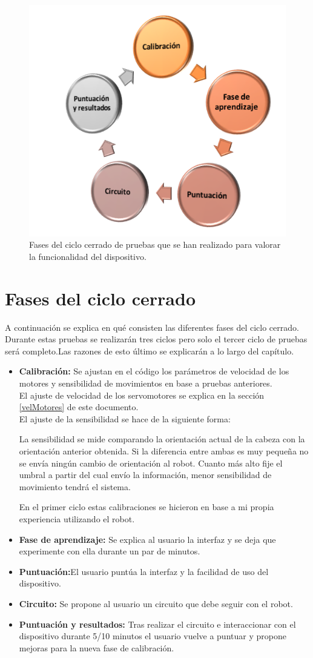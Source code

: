 \documentclass[twoside, 11pt]{epstfg}
\begin{document}
\begin{figure}[h!]
	\centerline{
		\mbox{\includegraphics[width=.60\textwidth]{images/CicloPruebas.png}}
	}
	\caption{Fases del ciclo cerrado de pruebas que se han realizado para valorar la funcionalidad del dispositivo.}
	\label{ciclo}
\end{figure}

\section{Fases del ciclo cerrado}
A continuación se explica en qué consisten las diferentes fases del ciclo cerrado. Durante estas pruebas se realizarán tres ciclos pero solo el tercer ciclo de pruebas será completo.Las razones de esto último se explicarán a lo largo del capítulo.

\begin{itemize}
	\item \textbf{Calibración:} Se ajustan en el código los parámetros de velocidad de los motores y sensibilidad de movimientos en base a pruebas anteriores.\\ El ajuste de velocidad de los servomotores se explica en la sección \ref{velMotores} de este documento.\\El ajuste de la sensibilidad se hace de la siguiente forma: 
	
	La sensibilidad se mide comparando la orientación actual de la cabeza con la orientación anterior obtenida. Si la diferencia entre ambas es muy pequeña no se envía ningún cambio de orientación al robot. Cuanto más alto fije el umbral a partir del cual envío la información, menor sensibilidad de movimiento tendrá el sistema.
	
	En el primer ciclo estas calibraciones se hicieron en base a mi propia experiencia utilizando el robot.
	\item \textbf{Fase de aprendizaje:} Se explica al usuario la interfaz y se deja que experimente con ella durante un par de minutos.
	\item \textbf{Puntuación:}El usuario puntúa la interfaz y la facilidad de uso del dispositivo.
	\item \textbf{Circuito:} Se propone al usuario un circuito que debe seguir con el robot.
	\item \textbf{Puntuación y resultados:} Tras realizar el circuito e interaccionar con el dispositivo durante 5/10 minutos el usuario vuelve a puntuar y propone mejoras para la nueva fase de calibración.
\end{itemize}
\end{document}
